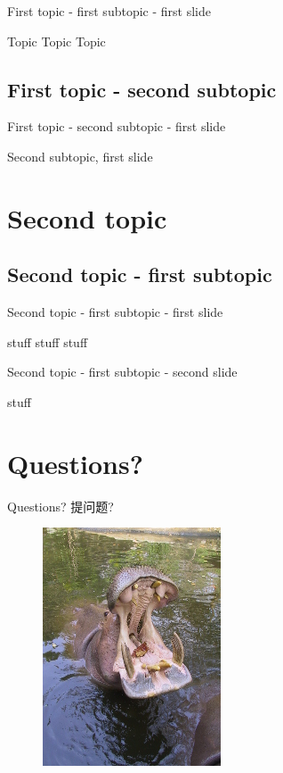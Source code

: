\begin{frame}{First topic - first subtopic - first slide}

Topic Topic Topic

\end{frame}

\subsection{First topic - second
subtopic}\label{first-topic---second-subtopic}

\begin{frame}{First topic - second subtopic - first slide}

Second subtopic, first slide

\end{frame}

\section{Second topic}\label{second-topic}

\frame{\tableofcontents[hideothersubsections]}

\subsection{Second topic - first
subtopic}\label{second-topic---first-subtopic}

\begin{frame}{Second topic - first subtopic - first slide}

stuff stuff stuff

\end{frame}

\begin{frame}{Second topic - first subtopic - second slide}

stuff

\end{frame}

\section{Questions?}\label{questions}

\begin{frame}{Questions? 提问题?}

\begin{figure}[htbp]
\centering
\includegraphics{./img/img_0510_200.jpg}
\caption{}
\end{figure}

\end{frame}
